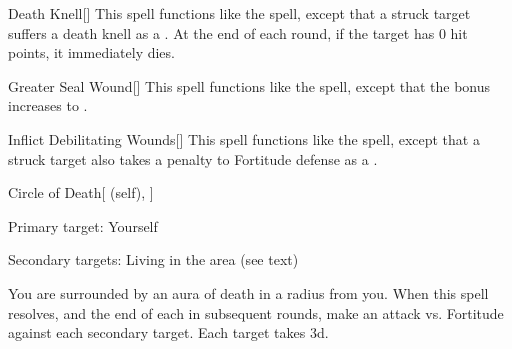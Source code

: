 \lowercase{\hypertarget{spell:Death Knell}{}}\label{spell:Death Knell}
\begin{freeability}[Rank 4]{\hypertarget{spell:Death Knell}{Death Knell}}[]
This spell functions like the  spell, except that a struck target suffers a death knell as a .
At the end of each round, if the target has 0 hit points, it immediately dies.
\end{freeability}
\vspace{0.25em}



\lowercase{\hypertarget{spell:Greater Seal Wound}{}}\label{spell:Greater Seal Wound}
\begin{freeability}[Rank 4]{\hypertarget{spell:Greater Seal Wound}{Greater Seal Wound}}[]
This spell functions like the  spell, except that the bonus increases to .
\end{freeability}
\vspace{0.25em}



\lowercase{\hypertarget{spell:Inflict Debilitating Wounds}{}}\label{spell:Inflict Debilitating Wounds}
\begin{freeability}[Rank 4]{\hypertarget{spell:Inflict Debilitating Wounds}{Inflict Debilitating Wounds}}[]
This spell functions like the  spell, except that a struck target also takes a  penalty to Fortitude defense as a .
\end{freeability}
\vspace{0.25em}



\lowercase{\hypertarget{spell:Circle of Death}{}}\label{spell:Circle of Death}
\begin{attuneability}[Rank 5]{\hypertarget{spell:Circle of Death}{Circle of Death}}[ (self), ]

Primary target: Yourself
\par\noindent
Secondary targets: Living  in the area (see text)

You are surrounded by an aura of death in a \areamed radius  from you.
When this spell resolves, and the end of each  in subsequent rounds, make an attack vs. Fortitude against each secondary target.
\hit Each target takes  \minus3d.
\end{attuneability}
\vspace{0.25em}



